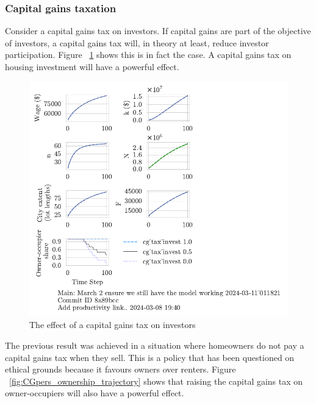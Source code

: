\subsubsection{Capital gains taxation}
Consider a capital gains tax on investors. If capital gains are part of the objective of investors, a capital gains tax will, in theory at least, reduce investor participation. Figure ~\ref{fig:CGinvest_ownership_trajectory} shows this is in fact the case. A capital gains tax on housing investment will have a powerful effect.
\begin{figure}[htb]
    \centering
    \includegraphics[scale=.8, trim={0 1.4cm 0 0},clip]{fig/cg_tax_invest-Main-_011821.pdf}
    \caption{The effect of a capital gains tax on investors}
    \label{fig:CGinvest_ownership_trajectory}
\end{figure}

The previous result was achieved in a situation where homeowners do not pay a capital gains tax when they sell. This is a policy that has been questioned on ethical grounds because it favours owners over renters.  Figure ~\ref{fig:CGpers_ownership_trajectory} shows that raising the capital gains tax on owner-occupiers will also have a powerful effect. 


